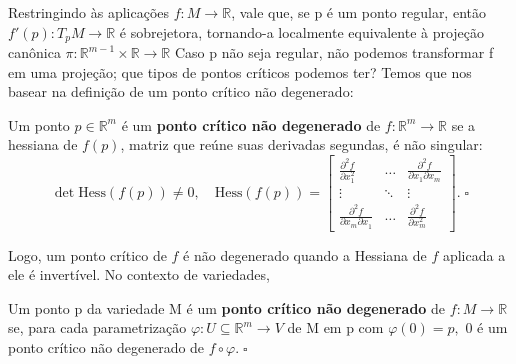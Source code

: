 \documentclass[../differential_topology.tex]{subfiles}
\begin{document}
Restringindo às aplicações \(f:M\rightarrow \mathbb{R}\), vale que, se p é um ponto regular, então \(f'(p):T_{p}M\rightarrow \mathbb{R}\) é sobrejetora, tornando-a localmente equivalente à projeção canônica \(\pi :\mathbb{R}^{m-1}\times \mathbb{R}\rightarrow \mathbb{R}\)
Caso p não seja regular, não podemos transformar f em uma projeção; que tipos de pontos críticos podemos ter? Temos que nos basear na definição de um ponto crítico não degenerado:
\begin{def*}
	Um ponto \(p\in \mathbb{R}^{m}\) é um \textbf{ponto crítico não degenerado} de \(f:\mathbb{R}^{m}\rightarrow \mathbb{R}\) se a hessiana de \(f(p)\), matriz que reúne suas derivadas segundas, é não singular:
	\[
		\det{\mathrm{Hess}(f(p))} \neq 0, \quad \mathrm{Hess}(f(p)) = \begin{bmatrix}
			\frac{\partial^{2}f}{\partial x_1^{2}}              & \dotsc & \frac{\partial^{2}f}{\partial x_1 \partial x_{m}^{}} \\
			\vdots                                              & \ddots & \vdots                                               \\
			\frac{\partial^{2}f}{\partial x_{m}\partial x_1^{}} & \dotsc & \frac{\partial^{2}f}{\partial x_{m}^{2}}
		\end{bmatrix}.\; \square
	\]
\end{def*}
Logo, um ponto crítico de \(f\) é não degenerado quando a Hessiana de \(f\) aplicada a ele é invertível. No contexto de variedades,
\begin{def*}
	Um ponto p da variedade M é um \textbf{ponto crítico não degenerado} de \(f:M\rightarrow \mathbb{R}\) se, para cada parametrização \(\varphi :U\subseteq \mathbb{R}^{m}\rightarrow V\) de M em p com \(\varphi (0) =p,\) 0 é um ponto crítico não degenerado de \(f\circ \varphi.\; \square\)
\end{def*}
\end{document}
